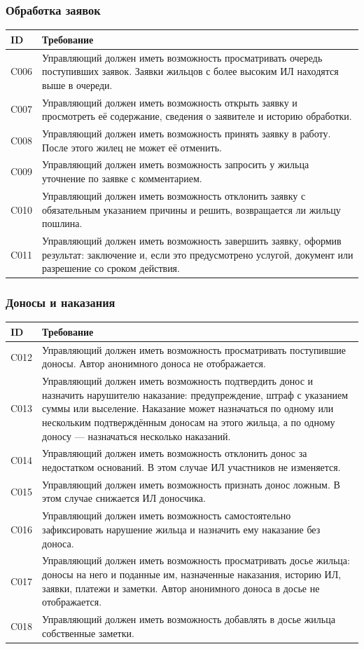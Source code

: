 \documentclass[12pt,a4paper]{article}
\newenvironment{reqtable}{%
  \begin{longtable}{L{14mm} L{146mm}}
  \toprule
  \textbf{ID} & \textbf{Требование} \\
  \midrule
  \endhead
  \bottomrule
  \endfoot
}{\end{longtable}}
\begin{document}
\subsubsection*{Обработка заявок}
\begin{reqtable}
C006 & Управляющий должен иметь возможность просматривать очередь поступивших заявок. Заявки жильцов с более высоким ИЛ находятся выше в очереди. \\
C007 & Управляющий должен иметь возможность открыть заявку и просмотреть её содержание, сведения о заявителе и историю обработки. \\
C008 & Управляющий должен иметь возможность принять заявку в работу. После этого жилец не может её отменить. \\
C009 & Управляющий должен иметь возможность запросить у жильца уточнение по заявке с комментарием. \\
C010 & Управляющий должен иметь возможность отклонить заявку с обязательным указанием причины и решить, возвращается ли жильцу пошлина. \\
C011 & Управляющий должен иметь возможность завершить заявку, оформив результат: заключение и, если это предусмотрено услугой, документ или разрешение со сроком действия. \\
\end{reqtable}

\subsubsection*{Доносы и наказания}
\begin{reqtable}
C012 & Управляющий должен иметь возможность просматривать поступившие доносы. Автор анонимного доноса не отображается. \\
C013 & Управляющий должен иметь возможность подтвердить донос и назначить нарушителю наказание: предупреждение, штраф с указанием суммы или выселение. Наказание может назначаться по одному или нескольким подтверждённым доносам на этого жильца, а по одному доносу --- назначаться несколько наказаний. \\
C014 & Управляющий должен иметь возможность отклонить донос за недостатком оснований. В этом случае ИЛ участников не изменяется. \\
C015 & Управляющий должен иметь возможность признать донос ложным. В этом случае снижается ИЛ доносчика. \\
C016 & Управляющий должен иметь возможность самостоятельно зафиксировать нарушение жильца и назначить ему наказание без доноса. \\
C017 & Управляющий должен иметь возможность просматривать досье жильца: доносы на него и поданные им, назначенные наказания, историю ИЛ, заявки, платежи и заметки. Автор анонимного доноса в досье не отображается. \\
C018 & Управляющий должен иметь возможность добавлять в досье жильца собственные заметки. \\
\end{reqtable}
\end{document}
